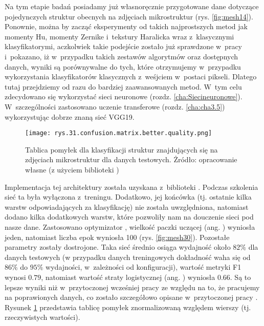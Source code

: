 Na tym etapie badań posiadamy już własnoręcznie przygotowane dane dotyczące pojedynczych struktur obecnych na zdjęciach mikrostruktur (rys. \ref{fig:mesh14}). Ponownie, można by zacząć eksperymenty od takich najprostszych metod jak momenty Hu, momenty Zernike i~tekstury Haralicka wraz z~klasycznymi klasyfikatorymi, aczkolwiek takie podejście zostało już sprawdzone w~pracy \cite{Reczek21} i~pokazano, iż w~przypadku takich zestawów algorytmów oraz dostępnych danych, wyniki są porównywalne do tych, które otrzymujemy w~przypadku wykorzystania klasyfikatorów klasycznych z~weśjciem w~postaci pikseli. Dlatego tutaj przejdziemy od razu do bardziej zaawansowanych metod. W~tym celu zdecydowano się wykorzystać sieci neuronowe (rozdz. \ref{cha:Siecineuronowe}). W~szczególności zastosowano uczenie transferowe (rozdz. \ref{cha:cha3.5}) wykorzystując dobrze znaną sieć VGG19. 
\begin{figure}[h]
    \centering
    \texttt{[image: rys.31.confusion.matrix.better.quality.png]}  %
    \caption{Tablica pomyłek dla klasyfikacji struktur znajdujących się na zdjęciach mikrostruktur dla danych testowych. Żródło: opracowanie własne (z użyciem biblioteki )}
    \label{fig:mesh29}
\end{figure}
Implementacja tej architektury została uzyskana z~biblioteki . Podczas szkolenia sieć ta była wyłączona z~treningu. Dodatkowo, jej końcówka (tj. ostatnie kilka warstw odpowiadających za klasyfikację) nie została uwzględniona, natomiast dodano kilka dodatkowych warstw, które pozwoliły nam na douczenie sieci pod nasze dane. Zastosowano optymizator , wielkość paczki uczącej (ang. ) wyniosła jeden, natomiast liczba epok wyniosła 100 (rys. \ref{fig:mesh30}). Pozostałe parametry zostały dostrojone. Taka sieć średnio osiąga wydajność około $82\%$ dla danych testowych (w przypadku danych treningowych dokładność waha się od $86\%$ do $95\%$ wydajności, w~zależności od konfiguracji), wartość metryki F1 wynosi $0.79$, natomiast wartość straty logistycznej (ang. ) wyniosła $0.66$. Są to lepsze wyniki niż w~przytoczonej wcześniej pracy \cite{Reczek21} ze względu na to, że pracujemy na poprawionych danych, co zostało szczegółowo opisane w~przytoczonej pracy \cite{Reczek21}. Rysunek \ref{fig:mesh29} przedstawia tablicę pomyłek znormalizowaną względem wierszy (tj. rzeczywistych wartości). 
